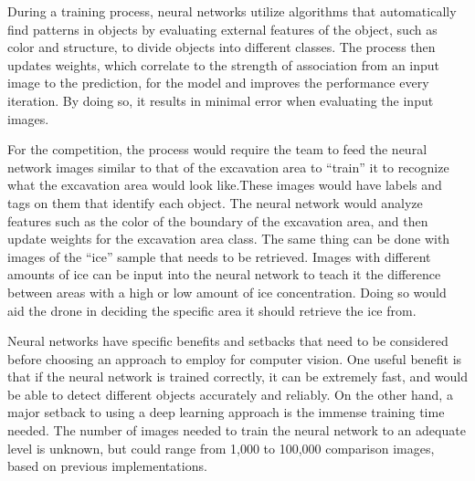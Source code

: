 			During a training process, neural networks utilize algorithms that automatically find patterns in objects by evaluating external features of the object, such as color and structure, to divide objects into different classes. The process then updates weights, which correlate to the strength of association from an input image to the prediction, for the model and improves the performance every iteration. By doing so, it results in minimal error when evaluating the input images.
		
			For the competition, the process would require the team to feed the neural network images similar to that of the excavation area to “train” it to recognize what the excavation area would look like.These images would have labels and tags on them that identify each object. The neural network would analyze features such as the color of the boundary of the excavation area, and then update weights for the excavation area class. The same thing can be done with images of the “ice” sample that needs to be retrieved. Images with different amounts of ice can be input into the neural network to teach it the difference between areas with a high or low amount of ice concentration. Doing so would aid the drone in deciding the specific area it should retrieve the ice from.
		
			Neural networks have specific benefits and setbacks that need to be considered before choosing an approach to employ for computer vision. One useful benefit is that if the neural network is trained correctly, it can be extremely fast, and would be able to detect different objects accurately and reliably. On the other hand, a major setback to using a deep learning approach is the immense training time needed. The number of images needed to train the neural network to an adequate level is unknown, but could range from 1,000 to 100,000 comparison images, based on previous implementations.

